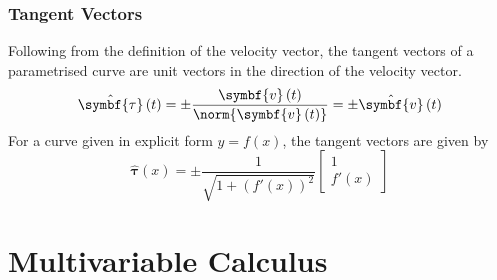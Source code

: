 \documentclass{article}
\begin{document}
\subsubsection{Tangent Vectors}
Following from the definition of the velocity vector, the tangent
vectors of a parametrised curve are unit vectors in the direction of
the velocity vector.
\begin{equation*}
    \hat{\symbf{\tau}}\left( t \right) = \pm \frac{\symbf{v}\left( t \right)}{\norm{\symbf{v}\left( t \right)}} = \pm \hat{\symbf{v}}\left( t \right)
\end{equation*}
For a curve given in explicit form \(y = f\left( x \right)\), the tangent vectors are given by
\begin{equation*}
    \hat{\symbf{\tau}}\left( x \right) = \pm \frac{1}{\sqrt{1 + \left( f'\left( x \right) \right)^2}}
    \begin{bmatrix}
        1 \\
        f'\left( x \right)
    \end{bmatrix}
\end{equation*}
\section{Multivariable Calculus}
\end{document}
